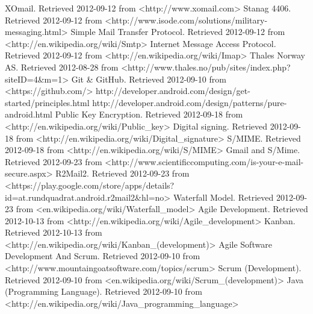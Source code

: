\documentclass[12pt]{report}
\begin{document}
	


	

\printglossaries
{}

\begin{thebibliography}{99}
 XOmail. Retrieved 2012-09-12 from <http://www.xomail.com>
 Stanag 4406. Retrieved 2012-09-12 from <http://www.isode.com/solutions/military-messaging.html>
 Simple Mail Transfer Protocol. Retrieved 2012-09-12 from <http://en.wikipedia.org/wiki/Smtp>
 Internet Message Access Protocol. Retrieved 2012-09-12 from <http://en.wikipedia.org/wiki/Imap>
 Thales Norway AS. Retrieved 2012-08-28 from <http://www.thales.no/pub/sites/index.php?siteID=4\&m=1>
 Git \& GitHub. Retrieved 2012-09-10 from <https://github.com/>
 http://developer.android.com/design/get-started/principles.html
 http://developer.android.com/design/patterns/pure-android.html
 Public Key Encryption. Retrieved 2012-09-18 from <http://en.wikipedia.org/wiki/Public\_key>
 Digital signing. Retrieved 2012-09-18 from <http://en.wikipedia.org/wiki/Digital\_signature>
 S/MIME. Retrieved 2012-09-18 from <http://en.wikipedia.org/wiki/S/MIME>
 Gmail and S/Mime. Retrieved 2012-09-23 from <http://www.scientificcomputing.com/is-your-e-mail-secure.aspx>
 R2Mail2. Retrieved 2012-09-23 from <https://play.google.com/store/apps/details?id=at.rundquadrat.android.r2mail2\&hl=no>
 Waterfall Model. Retrieved 2012-09-23 from <en.wikipedia.org/wiki/Waterfall\_model>
 Agile Development. Retrieved 2012-10-13 from <http://en.wikipedia.org/wiki/Agile\_development>
 Kanban. Retrieved 2012-10-13 from <http://en.wikipedia.org/wiki/Kanban\_(development)>
 Agile Software Development And Scrum. Retrieved 2012-09-10 from <http://www.mountaingoatsoftware.com/topics/scrum>
 Scrum (Development). Retrieved 2012-09-10 from <en.wikipedia.org/wiki/Scrum\_(development)>
 Java (Programming Language). Retrieved 2012-09-10 from
<http://en.wikipedia.org/wiki/Java\_programming\_language>

\end{thebibliography}
\end{document}
